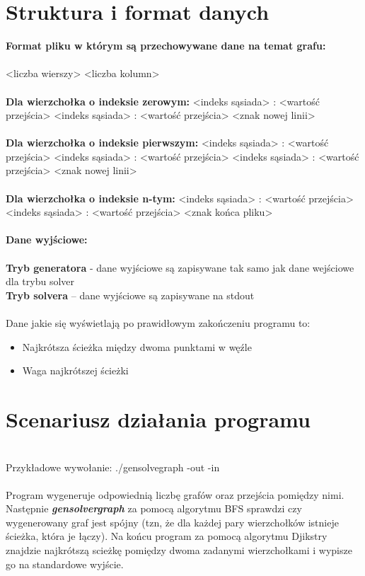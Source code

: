 \documentclass[polish, 12pt, a4paper]{article}
\begin{document}
\section{Struktura i format danych}
\textbf{\large{Format pliku w którym są przechowywane dane na temat grafu:}}
\\ 
\\
<liczba wierszy> <liczba kolumn>
\\ 
\\ 
\textbf{Dla wierzchołka o indeksie zerowym:} <indeks sąsiada> : <wartość przejścia>  <indeks sąsiada> : <wartość przejścia>  <znak nowej linii>
\\ 
\\ 
\textbf{Dla wierzchołka o indeksie pierwszym:} <indeks sąsiada> : <wartość przejścia>   <indeks sąsiada> : <wartość przejścia>   <indeks sąsiada> : <wartość przejścia>   <znak nowej linii>
\\ 
\\
\textbf{Dla wierzchołka o indeksie n-tym:} <indeks sąsiada> : <wartość przejścia>  <indeks sąsiada> : <wartość przejścia>  <znak końca pliku>
\\ 
\\ 
\textbf{\large{Dane wyjściowe:}}
\\ 
\\ 
\textbf{Tryb generatora} - dane wyjściowe są zapisywane tak samo jak dane wejściowe dla trybu solver
\\
\textbf{Tryb solvera} – dane wyjściowe są zapisywane na stdout
\\ 
\\
Dane jakie się wyświetlają po prawidłowym zakończeniu programu to:
\begin{itemize}
    \item Najkrótsza ścieżka między dwoma punktami w węźle 
    \item Waga najkrótszej ścieżki 
\end{itemize}
\section{Scenariusz działania programu}
\\
Przykładowe wywołanie:
./gensolvegraph -out -in
\\
\\
Program wygeneruje odpowiednią liczbę grafów oraz przejścia pomiędzy nimi. Następnie \textbf{\textit{gensolvergraph}} za pomocą algorytmu BFS sprawdzi czy wygenerowany graf jest spójny (tzn, że dla każdej pary wierzchołków istnieje ścieżka, która je łączy). Na końcu program za pomocą algorytmu Djikstry znajdzie najkrótszą scieżkę pomiędzy dwoma zadanymi wierzchołkami i wypisze go na standardowe wyjście.
\\
\\
\end{document}
